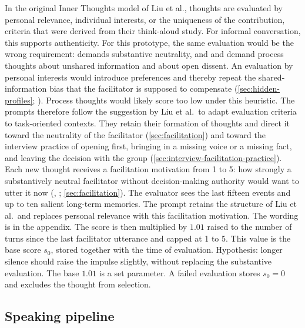 In the original Inner Thoughts model of Liu et al., thoughts are evaluated by personal relevance, individual
interests, or the uniqueness of the contribution, criteria that were derived from their think-aloud study.
For informal conversation, this supports authenticity.
For this prototype, the same evaluation would be the wrong requirement:
 demands substantive neutrality,
and  and  demand process thoughts about unshared
information and about open dissent.
An evaluation by personal interests would introduce preferences and thereby repeat the
shared-information bias that the facilitator is supposed to compensate
(\autoref{sec:hidden-profiles}; \cite{schulz-hardtGroupDecisionMaking2006}).
Process thoughts would likely score too low under this heuristic.
The prompts therefore follow the suggestion by Liu et al.\ to adapt evaluation criteria to task-oriented
contexts.
They retain their formation of thoughts and direct it toward the neutrality of the facilitator
(\autoref{sec:facilitation})
and toward the interview practice of opening first, bringing in a missing voice or a missing fact,
and leaving the decision with the group
(\autoref{sec:interview-facilitation-practice}).
Each new thought receives a facilitation motivation from 1 to 5: how strongly a substantively neutral
facilitator without decision-making authority would want to utter it now
(, ; \autoref{sec:facilitation}).
The evaluator sees the last fifteen events and up to ten salient long-term memories.
The prompt retains the structure of Liu et al.\ and replaces personal relevance with this
facilitation motivation.
The wording is in the appendix.
The score is then multiplied by \(1.01\) raised to the number of turns since the last facilitator utterance
and capped at 1 to 5.
This value is the base score \(s_0\), stored together with the time of evaluation.
Hypothesis: longer silence should raise the impulse slightly, without replacing the substantive evaluation.
The base \(1.01\) is a set parameter.
A failed evaluation stores \(s_0 = 0\) and excludes the thought from selection.

\subsection{Speaking pipeline}

